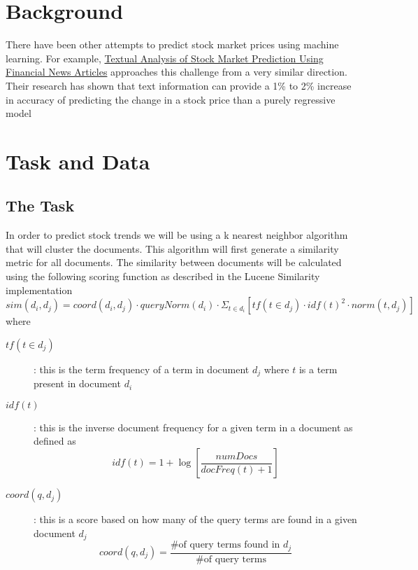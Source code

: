 \documentclass[11pt,letterpaper]{article}
\newcommand{\blue}[1]{\textcolor{RoyalBlue}{#1}}
\newcommand{\instructions}[1]{\blue{\textit{#1}}}
\begin{document}
\section{Background}
\label{sec:background}
  There have been other attempts to predict stock market prices using machine learning. For example, \href{http://ailab.arizona.edu/intranet/papers/Textual\%20Analysis\%20of\%20Stock\%20Market.pdf}{Textual Analysis of Stock Market Prediction Using Financial News Articles} approaches this challenge from a very similar direction. Their research has shown that text information can provide a 1\% to 2\% increase in accuracy of predicting the change in a stock price than a purely regressive model ~\cite{arizona}

\section{Task and Data}
\label{sec:taskAndData}

\subsection{The Task}
\label{sec:task}
In order to predict stock trends we will be using a k nearest neighbor algorithm that will cluster the documents.  This algorithm will first generate a similarity metric for all documents.  The similarity between documents will be calculated using the following scoring function as described in the Lucene Similarity implementation ~\cite{similarity}
\[
	sim(d_i, d_j) = coord(d_i, d_j) \cdot queryNorm(d_i) \cdot \Sigma_{t \in d_i} \left[ tf(t \in d_j) \cdot idf(t)^2 \cdot norm(t,d_j) \right]
\]
where
\begin{description}
	\item[\(tf(t \in d_j)\)] : this is the term frequency of a term in document \(d_j\) where \(t\) is a term present in document \(d_i\)
	\item[\(idf(t)\)] : this is the inverse document frequency for a given term in a document as defined as
	\[
		idf(t) = 1 + \log \left[ \frac{numDocs}{docFreq(t) + 1} \right]
	\]
	\item[\(coord(q,d_j)\)] : this is a score based on how many of the query terms are found in a given document \(d_j\)
	\[
		coord(q,d_j) = \frac{\text{\# of query terms found in } d_j }{\text{\# of query terms}}
	\]
\end{description}
\end{document}
